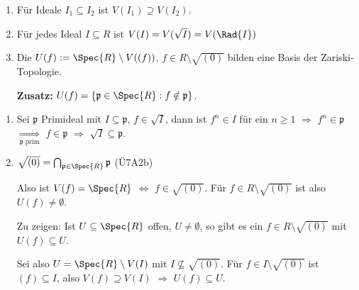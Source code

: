 \begin{Bem}

\begin{enumerate}
\item F\"ur Ideale $I_1 \subseteq I_2$ ist $V(I_1) \supseteq V(I_2)$.

\item F\"ur jedes Ideal $I \subseteq R$ ist $V(I) = V(\sqrt{I}) = V(\Rad{I})$

\item
Die $U(f) := \Spec{R}\setminus V( (f) )$, $f \in R \setminus \sqrt{(0)}$ bilden
eine Basis der Zariski-Topologie.

\textbf{Zusatz:} $U(f) = \{ \mathfrak{p} \in \Spec{R} : f \notin \mathfrak{p} \}$.
\end{enumerate}
\end{Bem}

\begin{Bew}
\begin{enumerate}
\item Sei $\mathfrak{p}$ Primideal mit $I \subseteq \mathfrak{p}$, $f \in
\sqrt{I}$, dann ist $f^n \in I$ f\"ur ein $n \geq 1$ $\Rightarrow$ $f^n \in
\mathfrak{p}$ $\underset{\mathfrak{p} \text{ prim}}\Rightarrow$ $f \in
\mathfrak{p}$ $\Rightarrow$ $\sqrt{I} \subseteq \mathfrak{p}$.
\item 
$\sqrt{(0)} = \bigcap_{\mathfrak{p} \in \Spec{R}}{\mathfrak{p}}$ (\"U7A2b)

Also ist $V(f) = \Spec{R}$ $\Leftrightarrow$ $f \in \sqrt{(0)}$. F\"ur $f \in R \setminus \sqrt{(0)}$ ist also $U(f) \neq \emptyset$.

Zu zeigen: Ist $U \subseteq \Spec{R}$ offen, $U \neq \emptyset$, so gibt es ein $f \in R \setminus \sqrt{(0)}$ mit $U(f) \subseteq U$.

Sei also $U = \Spec{R}\setminus V(I)$ mit $I \nsubseteq \sqrt{(0)}$. F\"ur $f
\in I \setminus \sqrt{(0)}$ ist $(f) \subseteq I$, also $V(f) \supseteq V(I)$
$\Rightarrow$ $U(f) \subseteq U$. 
\end{enumerate}
\end{Bew}

